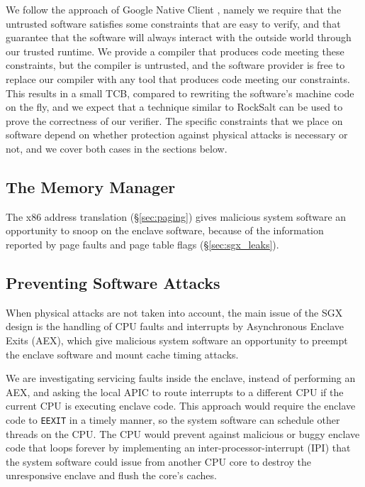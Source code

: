 We follow the approach of Google Native Client \cite{yee2009native}
\cite{sehr2010adapting}, namely we require that the untrusted software
satisfies some constraints that are easy to verify, and that guarantee that the
software will always interact with the outside world through our trusted
runtime. We provide a compiler that produces code meeting these constraints,
but the compiler is untrusted, and the software provider is free to replace our
compiler with any tool that produces code meeting our constraints. This results
in a small TCB, compared to rewriting the software's machine code on the fly,
and we expect that a technique similar to RockSalt \cite{morrisett2012rocksalt}
can be used to prove the correctness of our verifier. The specific constraints
that we place on software depend on whether protection against physical attacks
is necessary or not, and we cover both cases in the sections below.


\subsection{The Memory Manager}
\label{sec:memory_manager}

The x86 address translation (\S \ref{sec:paging}) gives malicious system
software an opportunity to snoop on the enclave software, because of the
information reported by page faults and page table flags
(\S \ref{sec:sgx_leaks}).



\subsection{Preventing Software Attacks}

When physical attacks are not taken into account, the main issue of the SGX
design is the handling of CPU faults and interrupts by Asynchronous Enclave
Exits (AEX), which give malicious system software an opportunity to preempt the
enclave software and mount cache timing attacks.

We are investigating servicing faults inside the enclave, instead of performing
an AEX, and asking the local APIC to route interrupts to a different CPU if the
current CPU is executing enclave code. This approach would require the enclave
code to \texttt{EEXIT} in a timely manner, so the system software can schedule
other threads on the CPU. The CPU would prevent against malicious or buggy
enclave code that loops forever by implementing an inter-processor-interrupt
(IPI) that the system software could issue from another CPU core to destroy the
unresponsive enclave and flush the core's caches.

